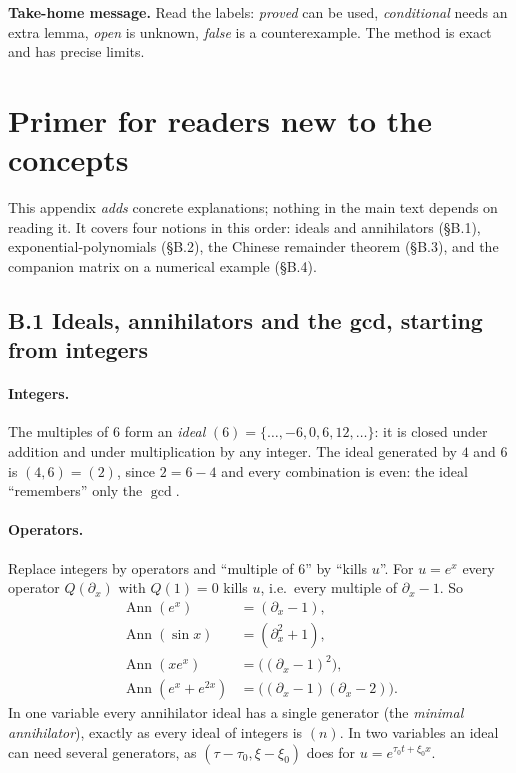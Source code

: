 \documentclass[11pt]{article}
\theoremstyle{plain}
\theoremstyle{definition}
\theoremstyle{remark}
\DeclareMathOperator{\Ann}{Ann}             %
\begin{document}
\medskip\textbf{Take-home message.} Read the labels: \emph{proved} can be used, \emph{conditional} needs an extra lemma, \emph{open} is unknown, \emph{false} is a counterexample. The method is exact and has precise limits.



\section{Primer for readers new to the concepts}\label{app:primer}

This appendix \emph{adds} concrete explanations; nothing in the main text depends on reading it. It covers four notions in this order: ideals and annihilators (\S B.1), exponential-polynomials (\S B.2), the Chinese remainder theorem (\S B.3), and the companion matrix on a numerical example (\S B.4).

\subsection*{B.1 Ideals, annihilators and the gcd, starting from integers}
\paragraph{Integers.} The multiples of $6$ form an \emph{ideal} $(6)=\{\dots,-6,0,6,12,\dots\}$: it is closed under addition and under multiplication by any integer. The ideal generated by $4$ and $6$ is $(4,6)=(2)$, since $2=6-4$ and every combination is even: the ideal ``remembers'' only the $\gcd$.

\paragraph{Operators.} Replace integers by operators and ``multiple of $6$'' by ``kills $u$''. For $u=e^{x}$ every operator $Q(\partial_x)$ with $Q(1)=0$ kills $u$, i.e.\ every multiple of $\partial_x-1$. So
\[
\begin{aligned}
\Ann(e^x)&=(\partial_x-1),\\
\Ann(\sin x)&=(\partial_x^2+1),\\
\Ann(xe^x)&=\big((\partial_x-1)^2\big),\\
\Ann(e^x+e^{2x})&=\big((\partial_x-1)(\partial_x-2)\big).
\end{aligned}
\]
In one variable every annihilator ideal has a single generator (the \emph{minimal annihilator}), exactly as every ideal of integers is $(n)$. In two variables an ideal can need several generators, as $(\tau-\tau_0,\xi-\xi_0)$ does for $u=e^{\tau_0t+\xi_0x}$.
\end{document}
